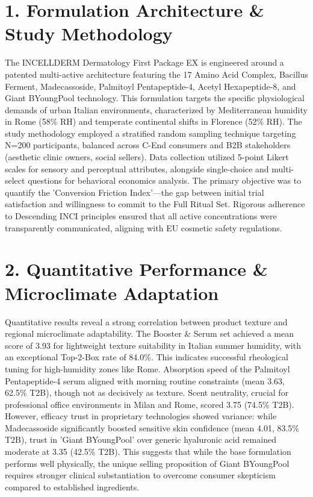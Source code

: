 \documentclass[10pt,twocolumn,a4paper]{article}
\begin{document}
\section{1. Formulation Architecture \& Study Methodology}
The INCELLDERM Dermatology First Package EX is engineered around a patented multi-active architecture featuring the 17 Amino Acid Complex, Bacillus Ferment, Madecassoside, Palmitoyl Pentapeptide-4, Acetyl Hexapeptide-8, and Giant BYoungPool technology. This formulation targets the specific physiological demands of urban Italian environments, characterized by Mediterranean humidity in Rome (58\% RH) and temperate continental shifts in Florence (52\% RH). The study methodology employed a stratified random sampling technique targeting N=200 participants, balanced across C-End consumers and B2B stakeholders (aesthetic clinic owners, social sellers). Data collection utilized 5-point Likert scales for sensory and perceptual attributes, alongside single-choice and multi-select questions for behavioral economics analysis. The primary objective was to quantify the 'Conversion Friction Index'—the gap between initial trial satisfaction and willingness to commit to the Full Ritual Set. Rigorous adherence to Descending INCI principles ensured that all active concentrations were transparently communicated, aligning with EU cosmetic safety regulations.
\section{2. Quantitative Performance \& Microclimate Adaptation}
Quantitative results reveal a strong correlation between product texture and regional microclimate adaptability. The Booster \& Serum set achieved a mean score of 3.93 for lightweight texture suitability in Italian summer humidity, with an exceptional Top-2-Box rate of 84.0\%. This indicates successful rheological tuning for high-humidity zones like Rome. Absorption speed of the Palmitoyl Pentapeptide-4 serum aligned with morning routine constraints (mean 3.63, 62.5\% T2B), though not as decisively as texture. Scent neutrality, crucial for professional office environments in Milan and Rome, scored 3.75 (74.5\% T2B). However, efficacy trust in proprietary technologies showed variance: while Madecassoside significantly boosted sensitive skin confidence (mean 4.01, 83.5\% T2B), trust in 'Giant BYoungPool' over generic hyaluronic acid remained moderate at 3.35 (42.5\% T2B). This suggests that while the base formulation performs well physically, the unique selling proposition of Giant BYoungPool requires stronger clinical substantiation to overcome consumer skepticism compared to established ingredients.
\end{document}

